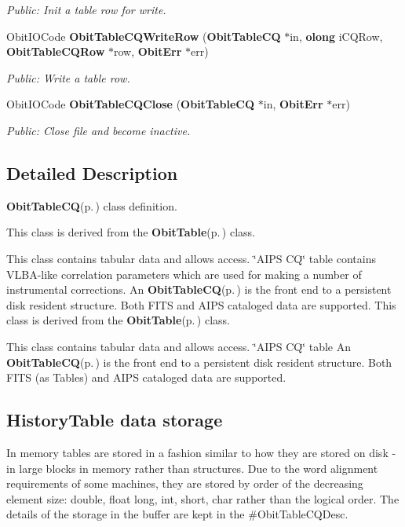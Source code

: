 \begin{CompactItemize}
\begin{CompactList}\small\item\em Public: Init a table row for write. \item\end{CompactList}\item 
Obit\-IOCode {\bf Obit\-Table\-CQWrite\-Row} ({\bf Obit\-Table\-CQ} $\ast$in, {\bf olong} i\-CQRow, {\bf Obit\-Table\-CQRow} $\ast$row, {\bf Obit\-Err} $\ast$err)
\begin{CompactList}\small\item\em Public: Write a table row. \item\end{CompactList}\item 
Obit\-IOCode {\bf Obit\-Table\-CQClose} ({\bf Obit\-Table\-CQ} $\ast$in, {\bf Obit\-Err} $\ast$err)
\begin{CompactList}\small\item\em Public: Close file and become inactive. \item\end{CompactList}\end{CompactItemize}


\subsection{Detailed Description}
{\bf Obit\-Table\-CQ}{\rm (p.\,\pageref{structObitTableCQ})} class definition. 

This class is derived from the {\bf Obit\-Table}{\rm (p.\,\pageref{structObitTable})} class.

This class contains tabular data and allows access. \char`\"{}AIPS CQ\char`\"{} table contains VLBA-like correlation parameters which are used for making a number of instrumental corrections. An {\bf Obit\-Table\-CQ}{\rm (p.\,\pageref{structObitTableCQ})} is the front end to a persistent disk resident structure. Both FITS and AIPS cataloged data are supported. This class is derived from the {\bf Obit\-Table}{\rm (p.\,\pageref{structObitTable})} class.

This class contains tabular data and allows access. \char`\"{}AIPS CQ\char`\"{} table An {\bf Obit\-Table\-CQ}{\rm (p.\,\pageref{structObitTableCQ})} is the front end to a persistent disk resident structure. Both FITS (as Tables) and AIPS cataloged data are supported.\subsection{History\-Table data storage}\label{ObitTableWX_8h_TableDataStorage}
In memory tables are stored in a fashion similar to how they are stored on disk - in large blocks in memory rather than structures. Due to the word alignment requirements of some machines, they are stored by order of the decreasing element size: double, float long, int, short, char rather than the logical order. The details of the storage in the buffer are kept in the \#Obit\-Table\-CQDesc.

